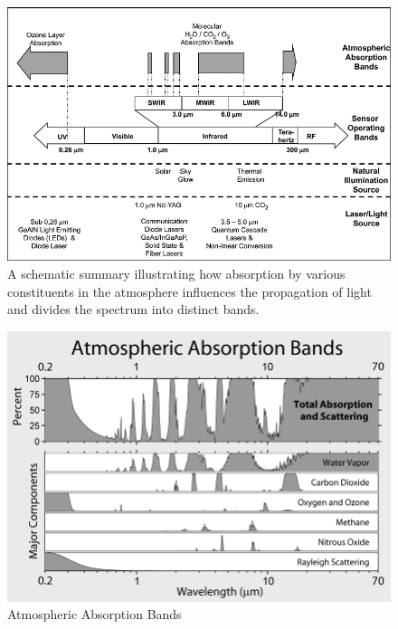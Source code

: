 \begin{figure}
\centering
\includegraphics[scale = 0.8]{chapters/img/intro_atmosphere.png}
\caption{A schematic summary illustrating how absorption by various constituents in the atmosphere influences the propagation of light and divides the spectrum into distinct bands.}
\label{fig:intro_atmosphere}
\end{figure}

\begin{figure}
\centering
\includegraphics[scale = 0.45]{chapters/img/intro_atmosphere_bands.png}
\caption{Atmospheric Absorption Bands}
\label{fig:intro_atmosphere_bands}
\end{figure}